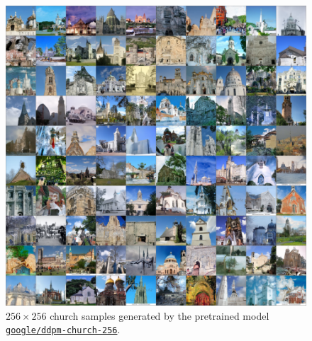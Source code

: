 \begin{appendixs}
        \begin{figure}
            \centering
            \includegraphics[scale=0.8]{img/results/ddpm-church-samples.png}
            \vspace{-4pt}  %
            \captionsetup{width=\textwidth} %
            \caption{$256\times256$ church samples generated by the pretrained model \href{https://huggingface.co/google/ddpm-church-256}{\texttt{\texttt{google/ddpm-church-256}}}.}
            \label{fig:ddpm-church-samples}
        \end{figure}


\end{appendixs}
